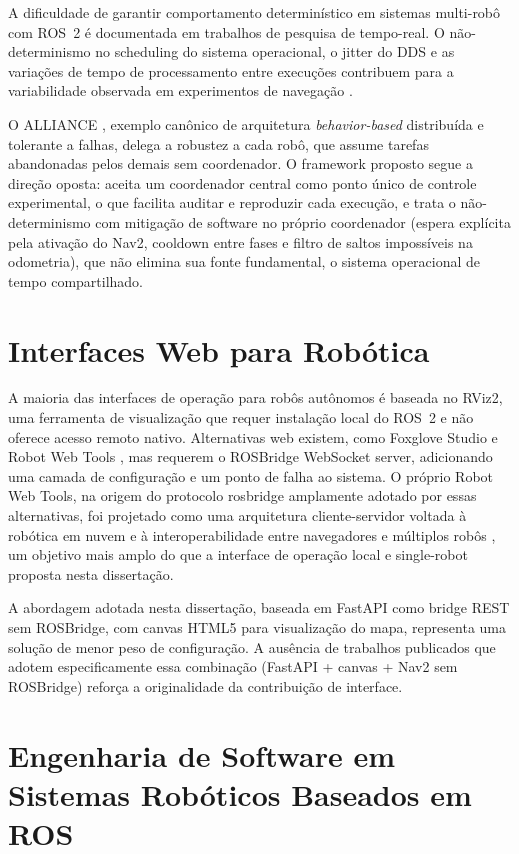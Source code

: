 A dificuldade de garantir comportamento determinístico em sistemas multi-robô
com ROS~2 é documentada em trabalhos de pesquisa de tempo-real. O não-determinismo
no scheduling do sistema operacional, o jitter do DDS e as variações de tempo de
processamento entre execuções contribuem para a variabilidade observada em
experimentos de navegação \cite{macenski2022ros2}.

O ALLIANCE \cite{parker1998}, exemplo canônico de arquitetura
\textit{behavior-based} distribuída e tolerante a falhas, delega a robustez a cada
robô, que assume tarefas abandonadas pelos demais sem coordenador. O framework
proposto segue a direção oposta: aceita um coordenador central como ponto único de
controle experimental, o que facilita auditar e reproduzir cada execução, e trata o
não-determinismo com mitigação de software no próprio coordenador (espera explícita
pela ativação do Nav2, cooldown entre fases e filtro de saltos impossíveis na
odometria), que não elimina sua fonte fundamental, o sistema operacional de tempo
compartilhado.

\section{Interfaces Web para Robótica}
\label{sec:rel_web}

A maioria das interfaces de operação para robôs autônomos é baseada no RViz2,
uma ferramenta de visualização que requer instalação local do ROS~2 e não oferece
acesso remoto nativo. Alternativas web existem, como Foxglove Studio e Robot Web
Tools \cite{toris2015}, mas requerem o ROSBridge WebSocket server, adicionando
uma camada de configuração e um ponto de falha ao sistema. O próprio Robot Web
Tools, na origem do protocolo rosbridge amplamente adotado por essas alternativas,
foi projetado como uma arquitetura cliente-servidor voltada à robótica em nuvem e
à interoperabilidade entre navegadores e múltiplos robôs \cite{toris2015}, um
objetivo mais amplo do que a interface de operação local e single-robot proposta
nesta dissertação.

A abordagem adotada nesta dissertação, baseada em FastAPI como bridge REST sem ROSBridge,
com canvas HTML5 para visualização do mapa, representa uma solução de menor
peso de configuração. A ausência de trabalhos publicados que adotem especificamente
essa combinação (FastAPI + canvas + Nav2 sem ROSBridge) reforça a originalidade
da contribuição de interface.

\section{Engenharia de Software em Sistemas Robóticos Baseados em ROS}
\label{sec:rel_es}


